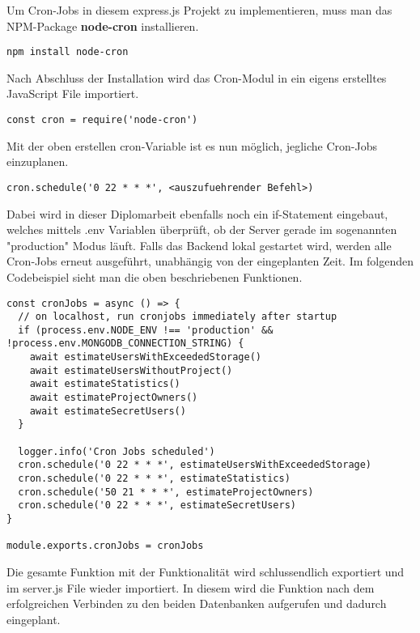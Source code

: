 Um Cron-Jobs in diesem express.js Projekt zu implementieren, muss man das NPM-Package \textbf{node-cron} installieren.
\begin{verbatim}
npm install node-cron
\end{verbatim}
Nach Abschluss der Installation wird das Cron-Modul in ein eigens erstelltes JavaScript File importiert.
\begin{verbatim}
const cron = require('node-cron')
\end{verbatim}
Mit der oben erstellen cron-Variable ist es nun möglich, jegliche Cron-Jobs einzuplanen.
\newline
\begin{lstlisting}
cron.schedule('0 22 * * *', <auszufuehrender Befehl>)
\end{lstlisting}
Dabei wird in dieser Diplomarbeit ebenfalls noch ein if-Statement eingebaut, welches mittels .env Variablen überprüft, ob der Server gerade im sogenannten "production" Modus läuft. Falls das Backend lokal gestartet wird, werden alle Cron-Jobs erneut ausgeführt, unabhängig von der eingeplanten Zeit. Im folgenden Codebeispiel sieht man die oben beschriebenen Funktionen.
\newline
\begin{lstlisting}
const cronJobs = async () => {
  // on localhost, run cronjobs immediately after startup
  if (process.env.NODE_ENV !== 'production' && !process.env.MONGODB_CONNECTION_STRING) {
    await estimateUsersWithExceededStorage()
    await estimateUsersWithoutProject()
    await estimateStatistics()
    await estimateProjectOwners()
    await estimateSecretUsers()
  }

  logger.info('Cron Jobs scheduled')
  cron.schedule('0 22 * * *', estimateUsersWithExceededStorage)
  cron.schedule('0 22 * * *', estimateStatistics)
  cron.schedule('50 21 * * *', estimateProjectOwners)
  cron.schedule('0 22 * * *', estimateSecretUsers)
}

module.exports.cronJobs = cronJobs
\end{lstlisting}
Die gesamte Funktion mit der Funktionalität wird schlussendlich exportiert und im server.js File wieder importiert. In diesem wird die Funktion nach dem erfolgreichen Verbinden zu den beiden Datenbanken aufgerufen und dadurch eingeplant.
